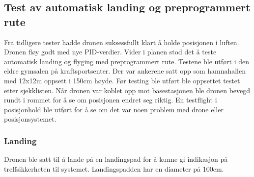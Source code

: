 \subsection{Test av automatisk landing og preprogrammert rute}
Fra tidligere tester hadde dronen suksessfullt klart å holde posisjonen i luften. 
Dronen fløy godt med nye PID-verdier. Vider i planen stod det å teste automatisk landing og flyging med preprogrammert rute. 
Testene ble utført i den eldre gymsalen på kraftsportsenter. 
Der var ankerene satt opp som hamnahallen med 12x12m oppsett i 150cm høyde. 
Før testing ble utført ble oppsettet testet etter sjekklisten. 
Når dronen var koblet opp mot basestasjonen ble dronen bevegd rundt i rommet for å se om posisjonen endret seg riktig. 
En testflight i posisjonhold ble utført for å se om det var noen problem med drone eller posisjonsystemet.  

\subsubsection{Landing}
Dronen ble satt til å lande på en landingspad for å kunne gi indikasjon på treffsikkerheten til systemet. Landingspadden har en diameter på 100cm. 
